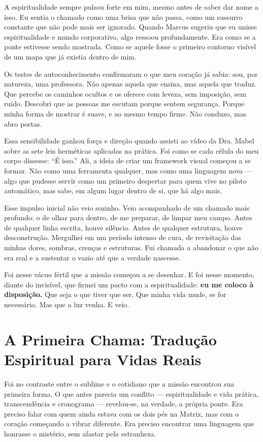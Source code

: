 \documentclass[12pt,a4paper]{book}
\begin{document}
A espiritualidade sempre pulsou forte em mim, mesmo antes de saber dar nome a isso. Eu sentia o chamado como uma brisa que não passa, como um sussurro constante que não pode mais ser ignorado. Quando Marcus sugeriu que eu unisse espiritualidade e mundo corporativo, algo ressoou profundamente. Era como se a ponte estivesse sendo mostrada. Como se aquele fosse o primeiro contorno visível de um mapa que já existia dentro de mim.

Os testes de autoconhecimento confirmaram o que meu coração já sabia: sou, por natureza, uma professora. Não apenas aquela que ensina, mas aquela que traduz. Que percebe os caminhos ocultos e os oferece com leveza, sem imposição, sem ruído. Descobri que as pessoas me escutam porque sentem segurança. Porque minha forma de mostrar é suave, e ao mesmo tempo firme. Não conduzo, mas abro portas.

Essa sensibilidade ganhou força e direção quando assisti ao vídeo da Dra. Mabel sobre as sete leis herméticas aplicadas na prática. Foi como se cada célula do meu corpo dissesse: ``É isso.'' Ali, a ideia de criar um framework visual começou a se formar. Não como uma ferramenta qualquer, mas como uma linguagem nova --- algo que pudesse servir como um primeiro despertar para quem vive no piloto automático, mas sabe, em algum lugar dentro de si, que há algo mais.

Esse impulso inicial não veio sozinho. Veio acompanhado de um chamado mais profundo: o de olhar para dentro, de me preparar, de limpar meu campo. Antes de qualquer linha escrita, houve silêncio. Antes de qualquer estrutura, houve desconstrução. Mergulhei em um período intenso de cura, de revisitação das minhas dores, sombras, crenças e estruturas. Fui chamada a abandonar o que não era real e a sustentar o vazio até que a verdade nascesse.

Foi nesse vácuo fértil que a missão começou a se desenhar. E foi nesse momento, diante do invisível, que firmei um pacto com a espiritualidade: \textbf{eu me coloco à disposição.} Que seja o que tiver que ser. Que minha vida mude, se for necessário. Mas que a luz venha. E veio.

\section{A Primeira Chama: Tradução Espiritual para Vidas Reais}

Foi no contraste entre o sublime e o cotidiano que a missão encontrou sua primeira forma. O que antes parecia um conflito --- espiritualidade e vida prática, transcendência e cronograma --- revelou-se, na verdade, a própria ponte. Era preciso falar com quem ainda estava com os dois pés na Matrix, mas com o coração começando a vibrar diferente. Era preciso encontrar uma linguagem que honrasse o mistério, sem afastar pela estranheza.
\end{document}
